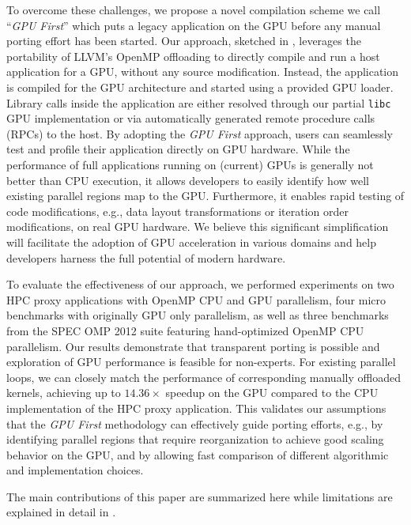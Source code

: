To overcome these challenges, we propose a novel compilation scheme we call ``\emph{GPU First}'' which puts a legacy application on the GPU before any manual porting effort has been started.
Our approach, sketched in , leverages the portability of LLVM's OpenMP offloading to directly compile and run a host application for a GPU, without any source modification.
Instead, the application is compiled for the GPU architecture and started using a provided GPU loader.
Library calls inside the application are either resolved through our partial \texttt{libc} GPU implementation or via automatically generated remote procedure calls (RPCs) to the host.
By adopting the \emph{GPU First} approach, users can seamlessly test and profile their application directly on GPU hardware.
While the performance of full applications running on (current) GPUs is generally not better than CPU execution, it allows developers to easily identify how well existing parallel regions map to the GPU.
Furthermore, it enables rapid testing of code modifications, e.g., data layout transformations or iteration order modifications, on real GPU hardware.
We believe this significant simplification will facilitate the adoption of GPU acceleration in various domains and help developers harness the full potential of modern hardware. 

To evaluate the effectiveness of our approach, we performed experiments on two HPC proxy applications with OpenMP CPU and GPU parallelism, four micro benchmarks with originally GPU only parallelism, as well as three benchmarks from the SPEC OMP 2012 suite featuring hand-optimized OpenMP CPU parallelism.
Our results demonstrate that transparent porting is possible and exploration of GPU performance is feasible for non-experts.
For existing parallel loops, we can closely match the performance of corresponding manually offloaded kernels, achieving up to $14.36\times$ speedup on the GPU compared to the CPU implementation of the HPC proxy application.
This validates our assumptions that the \emph{GPU First} methodology can effectively guide porting efforts, e.g., by identifying parallel regions that require reorganization to achieve good scaling behavior on the GPU, and by allowing fast comparison of different algorithmic and implementation choices.

The main contributions of this paper are summarized here while limitations are explained in detail in .

